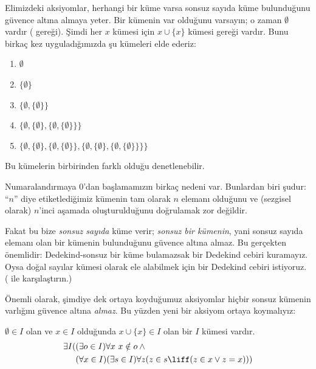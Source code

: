 


Elimizdeki aksiyomlar, herhangi bir küme varsa sonsuz sayıda küme
bulunduğunu güvence altına almaya yeter. Bir kümenin var olduğunu varsayın;
o zaman $\emptyset$ vardır ( gereği).
Şimdi her $x$ kümesi için $x \cup \{x\}$ kümesi
 gereği vardır. Bunu birkaç
kez uyguladığımızda şu kümeleri elde ederiz:
\begin{enumerate}
	\item[0.] $\emptyset$ %
	\item[1.] $ \{\emptyset\}$ %
	\item[2.] $\{\emptyset, \{\emptyset\}\}$ %
	\item[3.] $\{\emptyset, \{\emptyset\}, \{\emptyset, \{\emptyset\}\}\}$ %
	\item[4.] $\{\emptyset, \{\emptyset\}, \{\emptyset, \{\emptyset\}\}, \{\emptyset, \{\emptyset\}, \{\emptyset, \{\emptyset\}\}\}\}$%
\end{enumerate}
Bu kümelerin birbirinden farklı olduğu denetlenebilir.

Numaralandırmaya $0$'dan başlamamızın birkaç nedeni var. Bunlardan biri
şudur: ``$n$'' diye etiketlediğimiz kümenin tam olarak $n$ elemanı olduğunu
ve (sezgisel olarak) $n$'inci aşamada oluşturulduğunu doğrulamak zor değildir.

Fakat bu bize \emph{sonsuz sayıda} küme verir; \emph{sonsuz bir kümenin},
yani sonsuz sayıda elemanı olan bir kümenin bulunduğunu güvence altına almaz.
Bu gerçekten önemlidir: Dedekind-sonsuz bir küme bulamazsak bir Dedekind
cebiri kuramayız. Oysa doğal sayılar kümesi olarak ele alabilmek için bir
Dedekind cebiri istiyoruz. (
ile karşılaştırın.)

Önemli olarak, şimdiye dek ortaya koyduğumuz aksiyomlar hiçbir sonsuz
kümenin varlığını güvence altına \emph{almaz}. Bu yüzden yeni bir aksiyom
ortaya koymalıyız:

\begin{axiom}[Sonsuzluk]
$\emptyset \in I$ olan ve $x \in I$ olduğunda $x \cup \{x\} \in I$ olan
bir $I$ kümesi vardır.
\begin{align*}
	\exists I( & (\exists o \in I)\forall x\ x \notin o \land {}\\
	& (\forall x \in I)(\exists s \in I)\forall z(z \in s \liff (z \in x \lor z = x)))
\end{align*}
\end{axiom}

